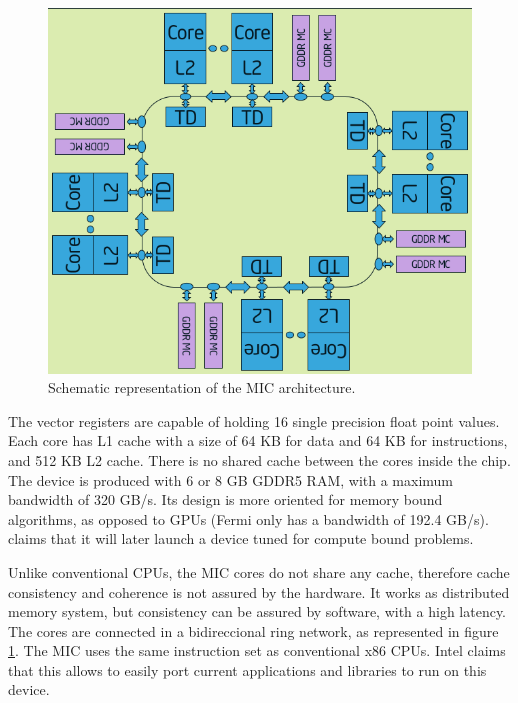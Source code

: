 \begin{figure}[!htp]
	\begin{center}
		\includegraphics[scale=0.4]{../../common/img/mic_arch.png}
		\caption{Schematic representation of the \intel MIC architecture.}
		\label{fig:MICArchitecture}
	\end{center}
\end{figure}

The vector registers are capable of holding 16 single precision float point values. Each core has L1 cache with a size of 64 KB for data and 64 KB for instructions, and 512 KB L2 cache. There is no shared cache between the cores inside the chip. The device is produced with 6 or 8 GB GDDR5 RAM, with a maximum bandwidth of 320 GB/s. Its design is more oriented for memory bound algorithms, as opposed to GPUs (Fermi only has a bandwidth of 192.4 GB/s). \intel claims that it will later launch a device tuned for compute bound problems.

Unlike conventional CPUs, the MIC cores do not share any cache, therefore cache consistency and coherence is not assured by the hardware. It works as distributed memory system, but consistency can be assured by software, with a high latency. The cores are connected in a bidireccional ring network, as represented in figure \ref{fig:MICArchitecture}. The MIC uses the same instruction set as conventional x86 CPUs. Intel claims that this allows to easily port current applications and libraries to run on this device.

